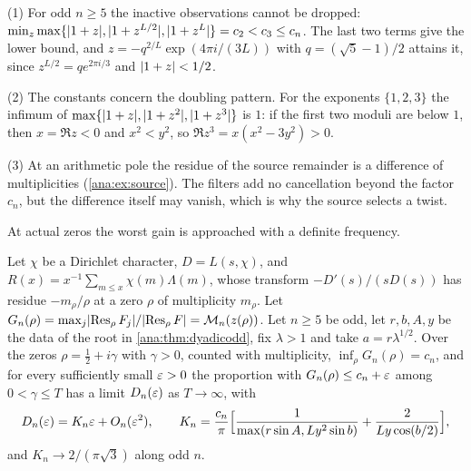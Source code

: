 \begin{remark}\label{ana:rem:dyadicactive}
(1) For odd $n\ge5$ the inactive observations cannot be dropped:
$\min_z\max\{\lvert1+z\rvert,\lvert1+z^{L/2}\rvert,\lvert1+z^L\rvert\}=c_2<c_3\le c_n$. The last two terms give
the lower bound, and $z=-q^{2/L}\exp(4\pi i/(3L))$ with $q=(\sqrt5-1)/2$ attains it, since
$z^{L/2}=qe^{2\pi i/3}$ and $\lvert1+z\rvert<1/2$.

(2) The constants concern the doubling pattern. For the exponents $\{1,2,3\}$ the infimum of
$\max\{\lvert1+z\rvert,\lvert1+z^2\rvert,\lvert1+z^3\rvert\}$ is $1$: if the first two moduli are below $1$,
then $x=\Re z<0$ and $x^2<y^2$, so $\Re z^3=x(x^2-3y^2)>0$.

(3) At an arithmetic pole the residue of the source remainder is a difference of
multiplicities (\cref{ana:ex:source}). The filters add no cancellation beyond the factor
$c_n$, but the difference itself may vanish, which is why the source selects a twist.
\end{remark}

At actual zeros the worst gain is approached with a definite frequency.

\begin{theorem}\label{ana:thm:dyadicfreq}
Let $\chi$ be a Dirichlet character, $D=L(s,\chi)$, and $R(x)=x^{-1}\sum_{m\le x}\chi(m)\Lambda(m)$,
whose transform $-D'(s)/(sD(s))$ has residue $-m_\rho/\rho$ at a zero $\rho$ of multiplicity
$m_\rho$. Let $G_n(\rho)=\max_j\lvert\operatorname{Res}_\rho F_j\rvert/\lvert\operatorname{Res}_\rho F\rvert=\mathcal{M}_n(z(\rho))$. Let
$n\ge5$ be odd, let $r,b,A,y$ be the data of the root in \cref{ana:thm:dyadicodd}, fix
$\lambda>1$ and take $a=r\lambda^{1/2}$. Over the zeros $\rho=\frac12+i\gamma$ with $\gamma>0$,
counted with multiplicity, $\inf_\rho G_n(\rho)=c_n$, and for every sufficiently small
$\varepsilon>0$ the proportion with $G_n(\rho)\le c_n+\varepsilon$ among $0<\gamma\le T$ has a limit
$D_n(\varepsilon)$ as $T\to\infty$, with
\[
 D_n(\varepsilon)=K_n\varepsilon+O_n(\varepsilon^2),\qquad
 K_n=\frac{c_n}\pi\Bigl[\frac1{\max(r\sin A,Ly^2\sin b)}+\frac2{Ly\cos(b/2)}\Bigr],
\]
and $K_n\to2/(\pi\sqrt3)$ along odd $n$.
\end{theorem}

